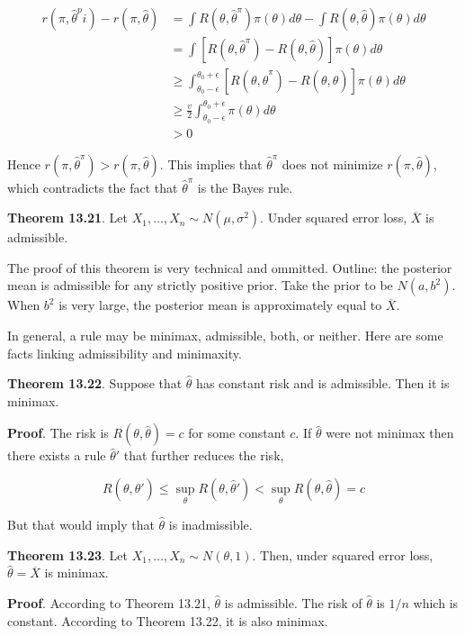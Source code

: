 \begin{align}
r(\pi, \hat{\theta}^pi) - r(\pi, \hat{\theta}) &= \int R(\theta, \hat{\theta}^\pi) \pi(\theta) d\theta - \int R(\theta, \hat{\theta}) \pi(\theta) d\theta \\
&= \int \left[ R(\theta, \hat{\theta}^\pi) - R(\theta, \hat{\theta})\right] \pi(\theta) d\theta \\
&\geq \int_{\theta_0 - \epsilon}^{\theta_0 + \epsilon} \left[ R(\theta, \hat{\theta}^\pi) - R(\theta, \hat{\theta})\right] \pi(\theta) d\theta \\
& \geq \frac{v}{2} \int_{\theta_0 - \epsilon}^{\theta_0 + \epsilon} \pi(\theta) d\theta \\
& > 0
\end{align}

Hence \(r(\pi, \hat{\theta}^\pi) > r(\pi, \hat{\theta})\). This implies
that \(\hat{\theta}^\pi\) does not minimize \(r(\pi, \hat{\theta})\),
which contradicts the fact that \(\hat{\theta}^\pi\) is the Bayes rule.

\textbf{Theorem 13.21}. Let \(X_1, \dots, X_n \sim N(\mu, \sigma^2)\).
Under squared error loss, \(\overline{X}\) is admissible.

The proof of this theorem is very technical and ommitted. Outline: the
posterior mean is admissible for any strictly positive prior. Take the
prior to be \(N(a, b^2)\). When \(b^2\) is very large, the posterior
mean is approximately equal to \(\overline{X}\).

In general, a rule may be minimax, admissible, both, or neither. Here
are some facts linking admissibility and minimaxity.

\textbf{Theorem 13.22}. Suppose that \(\hat{\theta}\) has constant risk
and is admissible. Then it is minimax.

\textbf{Proof}. The risk is \(R(\theta, \hat{\theta}) = c\) for some
constant \(c\). If \(\hat{\theta}\) were not minimax then there exists a
rule \(\hat{\theta}'\) that further reduces the risk,

\[R(\theta, \hat{\theta}') \leq \sup_{\theta} R(\theta, \hat{\theta}') < \sup_{\theta} R(\theta, \hat{\theta}) = c\]

But that would imply that \(\hat{\theta}\) is inadmissible.

\textbf{Theorem 13.23}. Let \(X_1, \dots, X_n \sim N(\theta, 1)\). Then,
under squared error loss, \(\hat{\theta} = \overline{X}\) is minimax.

\textbf{Proof}. According to Theorem 13.21, \(\hat{\theta}\) is
admissible. The risk of \(\hat{\theta}\) is \(1/n\) which is constant.
According to Theorem 13.22, it is also minimax.

